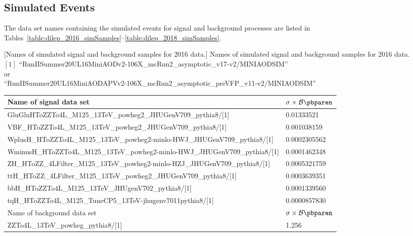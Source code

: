 \subsection{Simulated Events}
\label{sec:sim_samples_dilep}
The data set names containing the simulated events for signal and background processes are listed in Tables~\ref{table:dilep_2016_simSamples}--\ref{table:dilep_2018_simSamples}. %
\begin{table}[h]
    \small
        [Names of simulated signal and background samples for 2016 data.] %
        {Names of simulated signal and background samples for 2016 data. \\ %
        $[1]$ ``RunIISummer20UL16MiniAODv2-106X\_mcRun2\_asymptotic\_v17-v2/MINIAODSIM''
        \\
        or
        \\
        ``RunIISummer20UL16MiniAODAPVv2-106X\_mcRun2\_asymptotic\_preVFP\_v11-v2/MINIAODSIM''}
	\begin{tabular}{|ll|}
		\hline      
        Name of signal data set & $\sigma \times \mathcal{B}\pbparen$ \\
        \hline
		GluGluHToZZTo4L\_M125\_13TeV\_powheg2\_JHUGenV709\_pythia8/[1]	&	0.01333521	\\
		VBF\_HToZZTo4L\_M125\_13TeV\_powheg2\_JHUGenV709\_pythia8/[1]	&	0.001038159	\\
		WplusH\_HToZZTo4L\_M125\_13TeV\_powheg2-minlo-HWJ\_JHUGenV709\_pythia8/[1]	&	0.0002305562	\\
		WminusH\_HToZZTo4L\_M125\_13TeV\_powheg2-minlo-HWJ\_JHUGenV709\_pythia8/[1]	&	0.0001462348	\\
		ZH\_HToZZ\_4LFilter\_M125\_13TeV\_powheg2-minlo-HZJ\_JHUGenV709\_pythia8/[1]	&	0.0005321759	\\
		ttH\_HToZZ\_4LFilter\_M125\_13TeV\_powheg2\_JHUGenV709\_pythia8/[1]	&	0.0003639351	\\
		bbH\_HToZZTo4L\_M125\_13TeV\_JHUgenV702\_pythia8/[1]	&	0.0001339560	\\
		tqH\_HToZZTo4L\_M125\_TuneCP5\_13TeV-jhugenv7011\-pythia8/[1]	&	0.0000857830	\\
		\hline	
		\hline	
        Name of background data set & $\sigma \times \mathcal{B}\pbparen$ \\
		\hline	
		ZZTo4L\_13TeV\_powheg\_pythia8/[1]	&	1.256	\\

\end{tabular}
\end{table}
